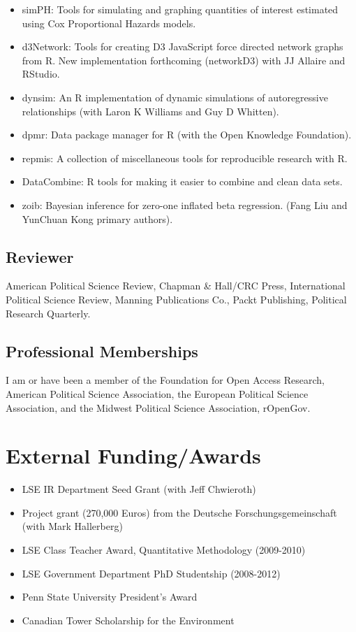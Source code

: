 \documentclass[a4paper]{article}
\begin{document}
{{\begin{itemize}
	\item simPH: Tools for simulating and graphing quantities of interest estimated using Cox Proportional Hazards models.
	\item d3Network: Tools for creating D3 JavaScript force directed network graphs from R. New implementation forthcoming (networkD3) with JJ Allaire and RStudio.
	\item dynsim: An R implementation of dynamic simulations of autoregressive relationships (with Laron K Williams and Guy D Whitten).
	\item dpmr: Data package manager for R (with the Open Knowledge Foundation).
	\item repmis: A collection of miscellaneous tools for reproducible research with R.
	\item DataCombine: R tools for making it easier to combine and clean data sets.
    \item zoib: Bayesian inference for zero-one inflated beta regression. (Fang Liu and YunChuan Kong primary authors).
\end{itemize}

\subsection*{Reviewer}

 American Political Science Review, Chapman \& Hall/CRC Press, International Political Science Review, Manning Publications Co., Packt Publishing, Political Research Quarterly.

\subsection*{Professional Memberships}

I am or have been a member of the Foundation for Open Access Research, American Political Science Association, the European Political Science Association, and the Midwest Political Science Association, rOpenGov.

\section*{External Funding/Awards}

\begin{itemize}

	\item LSE IR Department Seed Grant (with Jeff Chwieroth)
	\item Project grant (270,000 Euros) from the Deutsche Forschungsgemeinschaft (with Mark Hallerberg)
	\item LSE Class Teacher Award, Quantitative Methodology (2009-2010)
    \item LSE Government Department PhD Studentship (2008-2012)
	\item Penn State University President's Award
	\item Canadian Tower Scholarship for the Environment


\end{itemize}}}
\end{document}
